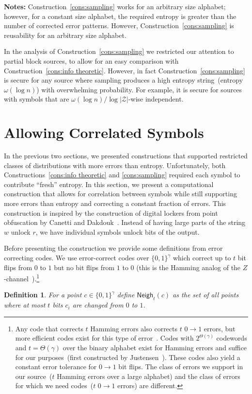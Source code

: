 \documentclass[11pt]{article}
\newcommand{\consref}[1]{\mbox{Construction~\ref{#1}}}
\newcommand{\class}[1]{{\ensuremath{\mathsf{#1}}}}
\newcommand{\zo}{\ensuremath{\{0, 1\}}}
\newcommand{\neigh}{\ensuremath{\class{Neigh}}\xspace}
\newtheorem{definition}[theorem]{Definition}
\begin{document}
\textbf{Notes:} \consref{cons:sampling} works for an arbitrary size alphabet; however, for a constant size alphabet, the required entropy is greater than the number of corrected error patterns.  However, \consref{cons:sampling} is reusability for an arbitrary size alphabet.

In the analysis of \consref{cons:sampling} we restricted our attention to partial block sources, to allow for an easy comparison with \consref{cons:info theoretic}.  However,  in fact \consref{cons:sampling}  is secure for any source where sampling produces a high entropy string~(entropy $\omega(\log n)$) with overwhelming probability. For example, it is secure for sources with symbols that are $\omega(\log n)/\log |\mathcal{Z}|$-wise independent. 


\section{Allowing Correlated Symbols}
\label{sec:cor construction}
In the previous two sections, we presented constructions that supported restricted classes of distributions with more errors than entropy.  Unfortunately, both Constructions~\ref{cons:info theoretic} and \ref{cons:sampling} required each symbol to contribute ``fresh'' entropy.  In this section, we present a computational construction that allows for correlation between symbols while still supporting more errors than entropy and correcting a constant fraction of errors.
This construction is inspired by the construction of digital lockers from point obfuscation by Canetti and Dakdouk~\cite{canetti2008obfuscating}.  Instead of having large parts of the string $w$ unlock $r$, we have individual symbols unlock bits of the output.  

Before presenting the construction we provide some definitions from error correcting codes.
We use error-correct codes over $\{0,1\}^\gamma$ which correct up to $t$ bit flips from $0$ to $1$ but no bit flips from $1$ to $0$ (this is the Hamming analog of the $Z$-channel~\cite{tallini2002capacity}).\footnote{Any code that corrects $t$ Hamming errors also corrects $t$ $0\rightarrow 1$ errors, but more efficient codes  exist for this type of error~\cite{tallini2002capacity}.
Codes with $2^{\Theta(\gamma)}$ codewords and $t = \Theta(\gamma)$ over the binary alphabet exist for Hamming errors and suffice for our purposes~(first constructed by Justensen~\cite{justesen1972class}).  These codes also yield a constant error tolerance for $0\rightarrow 1$ bit flips.
The class of errors we support in our source~($t$ Hamming errors over a large alphabet) and the class of errors for which we need codes~($t$ $0\rightarrow 1$ errors) are different.
}
\begin{definition}
\label{def:hamming z channel}
For a point $c\in \zo^\gamma$ define $\neigh_t(c) $ as the set of all points where at most $t$ bits $c_i$ are changed from $0$ to $1$.
\end{definition}
\end{document}
